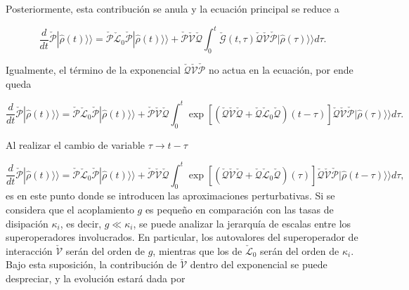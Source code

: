 \begin{appendixs}
Posteriormente, esta contribución se anula y la ecuación principal se reduce a

\begin{equation*}
    \frac{d}{dt}\check{\mathcal{P}}|\hat{\rho}(t)\rangle \rangle = \check{\mathcal{P}}\check{\mathcal{L}}_{0}\check{\mathcal{P}}|\hat{\rho}(t)\rangle \rangle + \check{\mathcal{P}}\check{\mathcal{V}}\check{\mathcal{Q}}\int_{0}^{t}\check{\mathcal{G}}(t,\tau)\check{\mathcal{Q}}\check{\mathcal{V}} \check{\mathcal{P}}|\hat{\rho}(\tau)\rangle \rangle d\tau.        
\end{equation*}

Igualmente, el término de la exponencial $\check{\mathcal{Q}}\check{\mathcal{V}}\check{\mathcal{P}}$ no actua en la ecuación, por ende queda  

\begin{equation*}
    \frac{d}{dt}\check{\mathcal{P}}|\hat{\rho}(t)\rangle \rangle  = \check{\mathcal{P}}\check{\mathcal{L}}_{0}\check{\mathcal{P}}|\hat{\rho}(t)\rangle \rangle  + \check{\mathcal{P}}\check{\mathcal{V}}\check{\mathcal{Q}}\int_{0}^{t}\exp \left[\left(\check{\mathcal{Q}}\check{\mathcal{V}}\check{\mathcal{Q}} + \check{\mathcal{Q}}\check{\mathcal{L}}_{0}\check{\mathcal{Q}}\right) (t-\tau) \right]\check{\mathcal{Q}}\check{\mathcal{V}} \check{\mathcal{P}}|\hat{\rho}(\tau)\rangle \rangle d\tau.        
\end{equation*}

Al realizar el cambio de variable $\tau \to t-\tau$

\begin{equation*}
    \frac{d}{dt}\check{\mathcal{P}}|\hat{\rho}(t)\rangle \rangle = \check{\mathcal{P}}\check{\mathcal{L}}_{0}\check{\mathcal{P}}|\hat{\rho}(t)\rangle \rangle  + \check{\mathcal{P}}\check{\mathcal{V}}\check{\mathcal{Q}}\int_{0}^{t}\exp \left[\left(\check{\mathcal{Q}}\check{\mathcal{V}}\check{\mathcal{Q}} + \check{\mathcal{Q}}\check{\mathcal{L}}_{0}\check{\mathcal{Q}}\right) (\tau) \right]\check{\mathcal{Q}}\check{\mathcal{V}} \check{\mathcal{P}}|\hat{\rho}(t-\tau)\rangle \rangle d\tau,        
\end{equation*}
es en este punto donde se introducen las aproximaciones perturbativas. Si se considera que el acoplamiento \( g \) es pequeño en comparación con las tasas de disipación \(\kappa_i\), es decir, \( g \ll \kappa_i \), se puede analizar la jerarquía de escalas entre los superoperadores involucrados. En particular, los autovalores del superoperador de interacción \(\check{\mathcal{V}}\) serán del orden de \(g\), mientras que los de \(\check{\mathcal{L}}_0\) serán del orden de \(\kappa_i\). Bajo esta suposición, la contribución de \(\check{\mathcal{V}}\) dentro del exponencial se puede despreciar,  y la evolución estará dada por


\end{appendixs}
